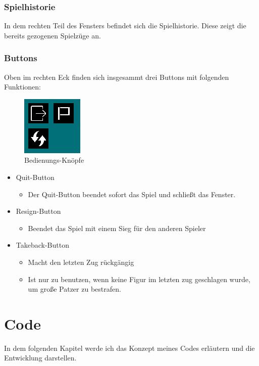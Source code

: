 \documentclass[a4paper, 10pt]{scrartcl}
\begin{document}
\subsubsection{Spielhistorie}

In dem rechten Teil des Fensters befindet sich die Spielhistorie. Diese zeigt die bereits gezogenen Spielzüge an. 

\subsubsection{Buttons}
Oben im rechten Eck finden sich insgesammt drei Buttons mit folgenden Funktionen:
\begin{figure}
        \centering
        \includegraphics{assets/Buttons.PNG}
        \caption{Bedienungs-Knöpfe}
\end{figure}

\begin{itemize}
        \item \glqq Quit\grqq-Button
        \begin{itemize}
                \item Der Quit-Button beendet sofort das Spiel und schließt das Fenster.
        \end{itemize}
        \item \glqq Resign\grqq-Button
        \begin{itemize}
                \item Beendet das Spiel mit einem Sieg für den anderen Spieler
        \end{itemize}
        \item \glqq Takeback\grqq-Button
        \begin{itemize}
                \item Macht den letzten Zug rückgängig
                \item Ist nur zu benutzen, wenn keine Figur im 
                letzten zug geschlagen wurde, um große Patzer zu bestrafen.
        \end{itemize}
\end{itemize}



\section{Code}
In dem folgenden Kapitel werde ich das Konzept meines Codes erläutern und die Entwicklung darstellen. 
\end{document}
